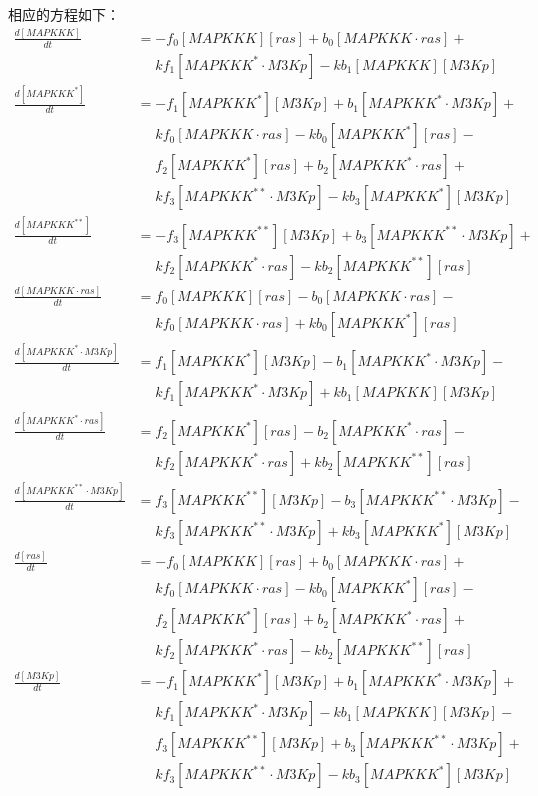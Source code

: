 相应的方程如下：
\small
\begin{equation*}
  \begin{align*}
    \frac{d[MAPKKK]}{dt} &= -f_{0}[MAPKKK][ras] + b_{0}[MAPKKK\cdot{}ras] +\\
    &\phantom{=} kf_{1}[MAPKKK^{*}\cdot{}M3Kp] - kb_{1}[MAPKKK][M3Kp]\\
    \frac{d[MAPKKK^{*}]}{dt} &= -f_{1}[MAPKKK^{*}][M3Kp] + b_{1}[MAPKKK^{*}\cdot{}M3Kp] +\\
    &\phantom{=} kf_{0}[MAPKKK\cdot{}ras] - kb_{0}[MAPKKK^{*}][ras] -\\
    &\phantom{=} f_{2}[MAPKKK^{*}][ras] + b_{2}[MAPKKK^{*}\cdot{}ras] +\\
    &\phantom{=} kf_{3}[MAPKKK^{**}\cdot{}M3Kp] - kb_{3}[MAPKKK^{*}][M3Kp]\\
    \frac{d[MAPKKK^{**}]}{dt} &= -f_{3}[MAPKKK^{**}][M3Kp] + b_{3}[MAPKKK^{**}\cdot{}M3Kp] +\\
    &\phantom{=} kf_{2}[MAPKKK^{*}\cdot{}ras] - kb_{2}[MAPKKK^{**}][ras]\\
    \frac{d[MAPKKK\cdot{}ras]}{dt} &= f_{0}[MAPKKK][ras] - b_{0}[MAPKKK\cdot{}ras] -\\
    &\phantom{=} kf_{0}[MAPKKK\cdot{}ras] + kb_{0}[MAPKKK^{*}][ras]\\
    \frac{d[MAPKKK^{*}\cdot{}M3Kp]}{dt} &= f_{1}[MAPKKK^{*}][M3Kp] - b_{1}[MAPKKK^{*}\cdot{}M3Kp] -\\
    &\phantom{=} kf_{1}[MAPKKK^{*}\cdot{}M3Kp] + kb_{1}[MAPKKK][M3Kp]\\
    \frac{d[MAPKKK^{*}\cdot{}ras]}{dt} &= f_{2}[MAPKKK^{*}][ras] - b_{2}[MAPKKK^{*}\cdot{}ras] -\\
    &\phantom{=} kf_{2}[MAPKKK^{*}\cdot{}ras] + kb_{2}[MAPKKK^{**}][ras]\\
    \frac{d[MAPKKK^{**}\cdot{}M3Kp]}{dt} &= f_{3}[MAPKKK^{**}][M3Kp] - b_{3}[MAPKKK^{**}\cdot{}M3Kp] -\\
    &\phantom{=} kf_{3}[MAPKKK^{**}\cdot{}M3Kp] + kb_{3}[MAPKKK^{*}][M3Kp]\\
    \frac{d[ras]}{dt} &= -f_{0}[MAPKKK][ras] + b_{0}[MAPKKK\cdot{}ras] +\\
    &\phantom{=} kf_{0}[MAPKKK\cdot{}ras] - kb_{0}[MAPKKK^{*}][ras] -\\
    &\phantom{=} f_{2}[MAPKKK^{*}][ras] + b_{2}[MAPKKK^{*}\cdot{}ras] +\\
    &\phantom{=} kf_{2}[MAPKKK^{*}\cdot{}ras] - kb_{2}[MAPKKK^{**}][ras]\\
    \frac{d[M3Kp]}{dt} &= -f_{1}[MAPKKK^{*}][M3Kp] + b_{1}[MAPKKK^{*}\cdot{}M3Kp] +\\
    &\phantom{=} kf_{1}[MAPKKK^{*}\cdot{}M3Kp] - kb_{1}[MAPKKK][M3Kp] -\\
    &\phantom{=} f_{3}[MAPKKK^{**}][M3Kp] + b_{3}[MAPKKK^{**}\cdot{}M3Kp] +\\
    &\phantom{=} kf_{3}[MAPKKK^{**}\cdot{}M3Kp] - kb_{3}[MAPKKK^{*}][M3Kp]\\
    
  \end{align*}
\end{equation*}
\normalsize

